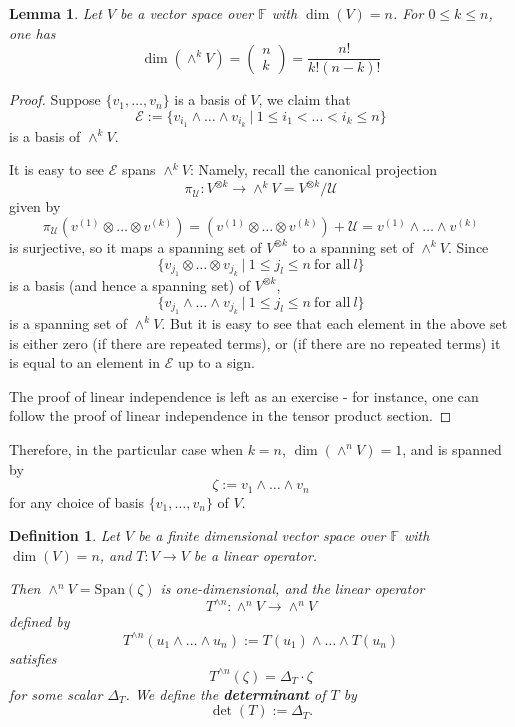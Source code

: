 \documentclass[12pt]{amsbook}
\newtheorem{definition}[theorem]{Definition}
\newtheorem{lemma}[theorem]{Lemma}
\begin{document}
\begin{lemma}
Let $V$ be a vector space over $\mathbb{F}$ with $\dim(V) = n$. For $0 \leq k \leq n$, one has
$$\dim(\wedge^k V) = \begin{pmatrix} n \\ k\end{pmatrix} = \frac{n!}{k!(n-k)!}$$
\end{lemma}
\begin{proof}
    
    
    
    Suppose $\{v_1 , \dots, v_n\}$ is a basis of $V$, we claim that 
    $$\mathcal{E} := \{v_{i_1} \wedge \dots \wedge v_{i_k}\ |\ 1 \leq i_1 < \dots < i_k \leq n\}$$
    is a basis of $\wedge^k V$.

    It is easy to see $\mathcal{E}$ spans $\wedge^k V$: Namely, recall the canonical projection
    $$\pi_{\mathcal{U}}: V^{\otimes k} \to \wedge^k V = V^{\otimes k}/\mathcal{U}$$
    given by 
    $$\pi_{\mathcal{U}}(v^{(1)} \otimes \dots \otimes v^{(k)}) = (v^{(1)} \otimes \dots \otimes v^{(k)}) + \mathcal{U} = v^{(1)} \wedge \dots \wedge v^{(k)}$$
    is surjective, so it maps a spanning set of $V^{\otimes k}$ to a spanning set of $\wedge^k V$. Since 
    $$\{v_{j_1} \otimes \dots \otimes v_{j_k}\ |\ 1 \leq j_{l} \leq n\ \text{for all}\ l\}$$
    is a basis (and hence a spanning set) of $V^{\otimes k}$, 
    $$\{v_{j_1} \wedge \dots \wedge v_{j_k}\ |\ 1 \leq j_{l} \leq n\ \text{for all}\ l\}$$
    is a spanning set of $\wedge^k V$. But it is easy to see that each element in the above set is either zero (if there are repeated terms), or (if there are no repeated terms) it is equal to an element in $\mathcal{E}$ up to a sign.

    The proof of linear independence is left as an exercise - for instance, one can follow the proof of linear independence in the tensor product section.
\end{proof}
Therefore, in the particular case when $k = n$, $\dim(\wedge^n V) = 1$, and is spanned by 
$$\zeta:= v_1 \wedge \dots \wedge v_n$$ 
for any choice of basis $\{v_1, \dots, v_n\}$ of $V$.

\begin{definition}
    Let $V$ be a finite dimensional vector space over $\mathbb{F}$ with $\dim(V) = n$, and $T:V \to V$ be a linear operator. 
    
    Then $\wedge^n V = \mathrm{Span}(\zeta)$ is one-dimensional, and the linear operator
    $$T^{\wedge n}: \wedge^n V \to \wedge^n V$$
    defined by
    $$T^{\wedge n}(u_1 \wedge \dots \wedge u_n) := T(u_1) \wedge \dots \wedge T(u_n)$$ satisfies
    $$T^{\wedge n}(\zeta) = \Delta_T \cdot \zeta$$
    for some scalar $\Delta_T$. We define the {\bf determinant} of $T$ by
    $$\det(T) := \Delta_T.$$
\end{definition}
\end{document}
